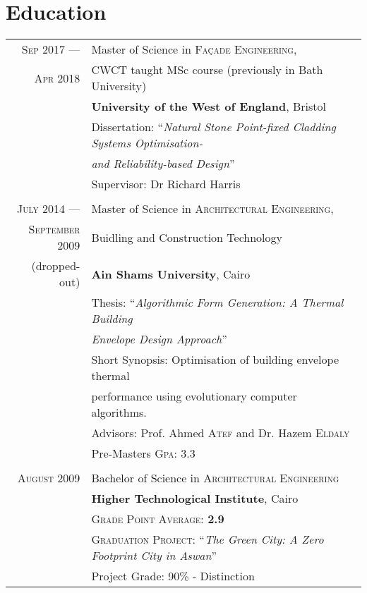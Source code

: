 \documentclass[a4paper,11pt]{article} %
\begin{document}
\vspace{0.5cm}

\section{Education}
\begin{tabular}{r|l}	

\textsc{Sep} 2017 --- & Master of Science in \textsc{Façade Engineering},\\ 
\textsc{Apr} 2018 & \small CWCT taught MSc course (previously in Bath University)\\
&\textbf{University of the West of England}, Bristol\\
& Dissertation: ``\emph{Natural Stone Point-fixed Cladding Systems Optimisation- }\\
&\emph{and Reliability-based Design}'' \\
&\small Supervisor: Dr Richard Harris \\
\multicolumn{2}{c}{} \\

	
\textsc{July} 2014 --- & Master of Science in \textsc{Architectural Engineering},\\ 
\textsc{September} 2009 & Buidling and Construction Technology\\
\small(dropped-out)& \textbf{Ain Shams University}, Cairo \\
& Thesis: ``\emph{Algorithmic Form Generation: A Thermal Building}\\
&\emph{Envelope Design Approach}'' \\
&\small Short Synopsis: Optimisation of building envelope thermal\\
&\small performance using evolutionary computer algorithms.\\
& \small Advisors: Prof. Ahmed \textsc{Atef} and Dr. Hazem \textsc{Eldaly}\\
&\normalsize Pre-Masters \textsc{Gpa}: 3.3\\
\multicolumn{2}{c}{} \\


\textsc{August} 2009& Bachelor of Science in \textsc{Architectural Engineering} \\
& \normalsize\textbf{Higher Technological Institute}, Cairo\\
&\small \textsc{Grade Point Average}: \textbf{2.9} \\
&\small \textsc{Graduation Project:} ``\emph{The Green City: A Zero Footprint City in Aswan}''\\
&\small Project Grade: 90\% - Distinction\\

\end{tabular}
\end{document}
